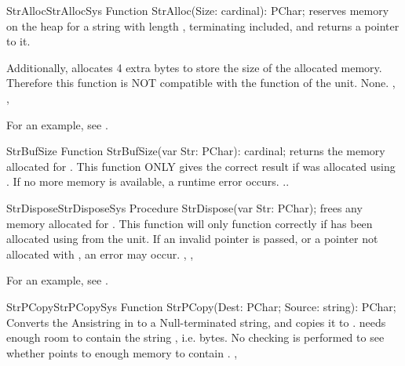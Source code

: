 \begin{functionl}{StrAlloc}{StrAllocSys}
\Declaration
Function StrAlloc(Size: cardinal): PChar;
\Description
{} reserves memory on the heap for a string with length ,
terminating  included, and returns a pointer to it.

Additionally,  allocates 4 extra bytes to store the size of
the allocated memory. Therefore this function is NOT compatible with the 
 function of the  unit.
\Errors
None.
\SeeAlso
{}, , 
\end{functionl}

For an example, see .
 
\begin{function}{StrBufSize}
\Declaration
Function StrBufSize(var Str: PChar): cardinal;
\Description
{} returns the memory allocated for . This function
ONLY gives the correct result if  was allocated using
.
\Errors
If no more memory is available, a runtime error occurs.
\SeeAlso
{}..
\end{function}



 
\begin{procedurel}{StrDispose}{StrDisposeSys}
\Declaration
Procedure StrDispose(var Str: PChar);
\Description
{} frees any memory allocated for . This function
will only function correctly if  has been allocated using
 from the  unit.
\Errors
If an invalid pointer is passed, or a pointer not allocated with
, an error may occur.
\SeeAlso
{}, , 
\end{procedurel}

For an example, see .
 
\begin{functionl}{StrPCopy}{StrPCopySys}
\Declaration
Function StrPCopy(Dest: PChar; Source: string): PChar;
\Description
{} Converts the Ansistring in  to a Null-terminated 
string, and copies it to .  needs enough room to contain
the string , i.e.  bytes.
\Errors
No checking is performed to see whether  points to enough memory
to contain .
\SeeAlso
{}, 
\end{functionl}

